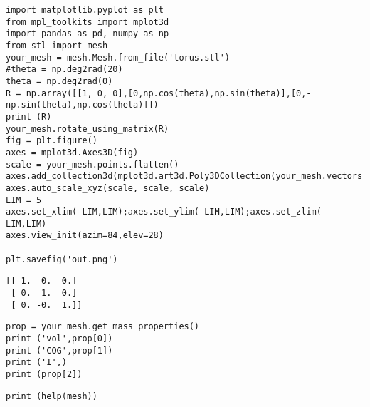 \documentclass[12pt,fleqn]{article}\usepackage{../../common}
\begin{document}
\begin{verbatim}
import matplotlib.pyplot as plt
from mpl_toolkits import mplot3d
import pandas as pd, numpy as np
from stl import mesh
your_mesh = mesh.Mesh.from_file('torus.stl')
#theta = np.deg2rad(20)
theta = np.deg2rad(0)
R = np.array([[1, 0, 0],[0,np.cos(theta),np.sin(theta)],[0,-np.sin(theta),np.cos(theta)]])
print (R)
your_mesh.rotate_using_matrix(R)
fig = plt.figure()
axes = mplot3d.Axes3D(fig)
scale = your_mesh.points.flatten()
axes.add_collection3d(mplot3d.art3d.Poly3DCollection(your_mesh.vectors,alpha=0.3))
axes.auto_scale_xyz(scale, scale, scale)
LIM = 5
axes.set_xlim(-LIM,LIM);axes.set_ylim(-LIM,LIM);axes.set_zlim(-LIM,LIM)
axes.view_init(azim=84,elev=28)

plt.savefig('out.png')
\end{verbatim}

\begin{verbatim}
[[ 1.  0.  0.]
 [ 0.  1.  0.]
 [ 0. -0.  1.]]
\end{verbatim}


\begin{verbatim}
prop = your_mesh.get_mass_properties()
print ('vol',prop[0])
print ('COG',prop[1])
print ('I',)
print (prop[2])
\end{verbatim}












\begin{verbatim}
print (help(mesh))
\end{verbatim}
\end{document}
